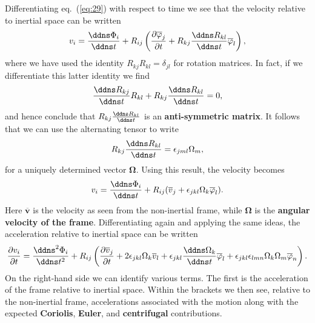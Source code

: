 Differentiating eq.~(\ref{eq:29}) with respect to time 
we see that the velocity relative to inertial space can be written
\begin{equation}
v_{i}=\frac{\ddns \Phi_{i}}{\ddns t}+R_{ij}\left(\frac{\partial\overline{\varphi}_{j}}{\partial t}+R_{kj}\frac{\ddns R_{kl}}{\ddns t}\overline{\varphi}_{l}\right),
\label{eq:30}
\end{equation}
where we have used the identity $R_{kj}R_{kl}=\delta_{jl}$ for rotation matrices. 
In fact, if we differentiate this latter identity we find
\begin{equation}
\frac{\ddns R_{kj}}{\ddns t}R_{kl}+R_{kj}\frac{\ddns R_{kl}}{\ddns t}=0,
\label{eq:31}
\end{equation}
and hence conclude that $R_{kj}\frac{\ddns R_{kl}}{\ddns t}$ is an \textbf{anti-symmetric matrix}. It follows that we can use the 
alternating tensor to write
\begin{equation}
R_{kj}\frac{\ddns R_{kl}}{\ddns t}=\epsilon_{jml}\Omega_{m},
\label{eq:32}
\end{equation}
for a uniquely determined vector $\bm{\Omega}$. Using this result, the velocity becomes
\begin{equation}
v_{i}=\frac{\ddns \Phi_{i}}{\ddns t}+R_{ij}(\overline{v}_{j}+\epsilon_{jkl}\Omega_{k}\overline{\varphi}_{l}).
\label{eq:33}
\end{equation}
Here $\overline{\mathbf{v}}$ is the velocity as seen from the non-inertial frame, while $\bm{\Omega}$ is the 
\textbf{angular velocity of the frame}. Differentiating again and applying the same ideas, the acceleration relative 
to inertial space can be written
\begin{equation}
\frac{\partial v_{i}}{\partial t}=\frac{\ddns ^{2}\Phi_{i}}{\ddns t^{2}}+R_{ij}\left(\frac{\partial\overline{v}_{j}}{\partial t}+2\epsilon_{jkl}\Omega_{k}\overline{v}_{l}+\epsilon_{jkl}\frac{\ddns \Omega_{k}}{\ddns t}\overline{\varphi}_{l}+\epsilon_{jkl}\epsilon_{lmn}\Omega_{k}\Omega_{m}\overline{\varphi}_{n}\right).
\label{eq:34}
\end{equation}
On the right-hand side we can identify various terms. The first is the acceleration of the frame relative to 
inertial space. Within the brackets we then see, relative to the non-inertial frame, accelerations associated 
with the motion along with the expected \textbf{Coriolis}, \textbf{Euler}, and \textbf{centrifugal} contributions.

